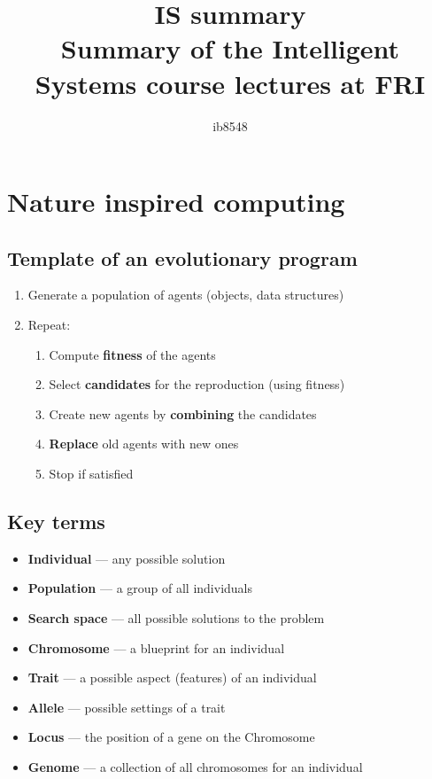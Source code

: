 \documentclass{article}
\author{ib8548}
\title{IS summary \\
    \large Summary of the Intelligent Systems course lectures at FRI}
\begin{document}
\maketitle \newpage
\tableofcontents \newpage

\section{Nature inspired computing}
    \subsection{Template of an evolutionary program}
    \begin{enumerate}
        \item Generate a population of agents (objects, data structures)
        \item Repeat:
            \begin{enumerate}[{2.1}]
                \item Compute \textbf{fitness} of the agents
                \item Select \textbf{candidates} for the reproduction (using fitness)
                \item Create new agents by \textbf{combining} the candidates
                \item \textbf{Replace} old agents with new ones
                \item Stop if satisfied
            \end{enumerate}
    \end{enumerate}

    \subsection{Key terms}
    \begin{itemize}
        \item \textbf{Individual} --- any possible solution
        \item \textbf{Population} --- a group of all individuals
        \item \textbf{Search space} --- all possible solutions to the problem
        \item \textbf{Chromosome} --- a blueprint for an individual
        \item \textbf{Trait} --- a possible aspect (features) of an individual
        \item \textbf{Allele} --- possible settings of a trait
        \item \textbf{Locus} --- the position of a gene on the Chromosome
        \item \textbf{Genome} --- a collection of all chromosomes for an individual
    \end{itemize}
\end{document}
